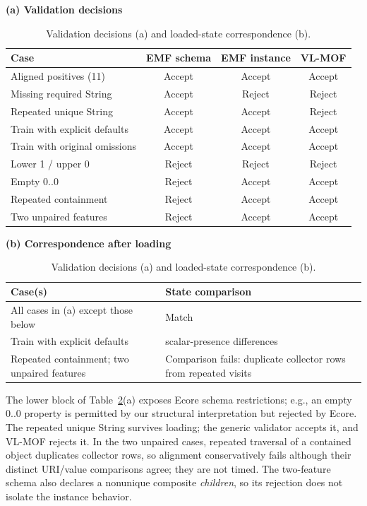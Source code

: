 \begin{table}[tbp]
\centering\small
\caption{Validation decisions (a) and loaded-state correspondence (b).}
\label{tab:correctness}
\textbf{(a) Validation decisions}\\[3pt]
\begin{tabular}{p{49mm}ccc}
\hline
Case & EMF schema & EMF instance & VL-MOF \\
\hline
Aligned positives (11) & Accept & Accept & Accept \\
Missing required String & Accept & Reject & Reject \\
Repeated unique String & Accept & Accept & Reject \\
Train with explicit defaults & Accept & Accept & Accept \\
Train with original omissions & Accept & Accept & Accept \\
\hline
Lower 1 / upper 0 & Reject & Reject & Reject \\
Empty $0..0$ & Reject & Accept & Accept \\
Repeated containment & Reject & Accept & Accept \\
Two unpaired features & Reject & Accept & Accept \\
\hline
\end{tabular}

\medskip
\textbf{(b) Correspondence after loading}\\[3pt]
\begin{tabular}{>{\raggedright\arraybackslash}p{54mm}>{\raggedright\arraybackslash}p{60mm}}
\hline
Case(s) & State comparison \\
\hline
All cases in (a) except those below & Match \\
Train with explicit defaults & 12 scalar-presence differences \\
Repeated containment; two unpaired features & Comparison fails: duplicate collector rows from repeated visits \\
\hline
\end{tabular}
\end{table}

The lower block of Table~\ref{tab:correctness}(a) exposes Ecore schema
restrictions; e.g., an empty $0..0$ property is permitted by our structural
interpretation but rejected by Ecore. The repeated unique String survives
loading; the generic validator accepts it, and VL-MOF rejects it. In the two
unpaired cases, repeated traversal of a contained object duplicates collector
rows, so alignment conservatively fails although their distinct URI/value
comparisons agree; they are not timed. The two-feature schema also declares a
nonunique composite \emph{children}, so its rejection does not isolate the
instance behavior.

